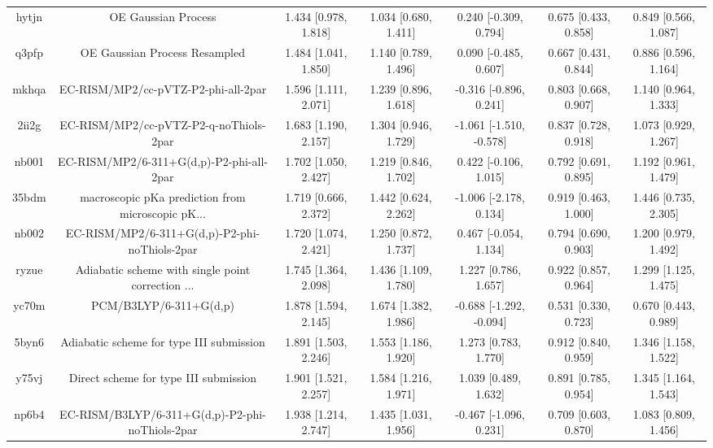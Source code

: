\documentclass{article}
\begin{document}
\begin{center}
\begin{longtable}{|ccccccc|}
 hytjn &                                OE Gaussian Process &  1.434 [0.978, 1.818] &  1.034 [0.680, 1.411] &    0.240 [-0.309, 0.794] &  0.675 [0.433, 0.858] &   0.849 [0.566, 1.087] \\
 q3pfp &                      OE Gaussian Process Resampled &  1.484 [1.041, 1.850] &  1.140 [0.789, 1.496] &    0.090 [-0.485, 0.607] &  0.667 [0.431, 0.844] &   0.886 [0.596, 1.164] \\
 mkhqa &                EC-RISM/MP2/cc-pVTZ-P2-phi-all-2par &  1.596 [1.111, 2.071] &  1.239 [0.896, 1.618] &   -0.316 [-0.896, 0.241] &  0.803 [0.668, 0.907] &   1.140 [0.964, 1.333] \\
 2ii2g &             EC-RISM/MP2/cc-pVTZ-P2-q-noThiols-2par &  1.683 [1.190, 2.157] &  1.304 [0.946, 1.729] &  -1.061 [-1.510, -0.578] &  0.837 [0.728, 0.918] &   1.073 [0.929, 1.267] \\
 nb001 &           EC-RISM/MP2/6-311+G(d,p)-P2-phi-all-2par &  1.702 [1.050, 2.427] &  1.219 [0.846, 1.702] &    0.422 [-0.106, 1.015] &  0.792 [0.691, 0.895] &   1.192 [0.961, 1.479] \\
 35bdm &  macroscopic pKa prediction from microscopic pK... &  1.719 [0.666, 2.372] &  1.442 [0.624, 2.262] &   -1.006 [-2.178, 0.134] &  0.919 [0.463, 1.000] &   1.446 [0.735, 2.305] \\
 nb002 &      EC-RISM/MP2/6-311+G(d,p)-P2-phi-noThiols-2par &  1.720 [1.074, 2.421] &  1.250 [0.872, 1.737] &    0.467 [-0.054, 1.134] &  0.794 [0.690, 0.903] &   1.200 [0.979, 1.492] \\
 ryzue &  Adiabatic scheme with single point correction ... &  1.745 [1.364, 2.098] &  1.436 [1.109, 1.780] &     1.227 [0.786, 1.657] &  0.922 [0.857, 0.964] &   1.299 [1.125, 1.475] \\
 yc70m &                             PCM/B3LYP/6-311+G(d,p) &  1.878 [1.594, 2.145] &  1.674 [1.382, 1.986] &  -0.688 [-1.292, -0.094] &  0.531 [0.330, 0.723] &   0.670 [0.443, 0.989] \\
 5byn6 &           Adiabatic scheme for type III submission &  1.891 [1.503, 2.246] &  1.553 [1.186, 1.920] &     1.273 [0.783, 1.770] &  0.912 [0.840, 0.959] &   1.346 [1.158, 1.522] \\
 y75vj &              Direct scheme for type III submission &  1.901 [1.521, 2.257] &  1.584 [1.216, 1.971] &     1.039 [0.489, 1.632] &  0.891 [0.785, 0.954] &   1.345 [1.164, 1.543] \\
 np6b4 &    EC-RISM/B3LYP/6-311+G(d,p)-P2-phi-noThiols-2par &  1.938 [1.214, 2.747] &  1.435 [1.031, 1.956] &   -0.467 [-1.096, 0.231] &  0.709 [0.603, 0.870] &   1.083 [0.809, 1.456] \\

\end{longtable}
\end{center}
\end{document}
